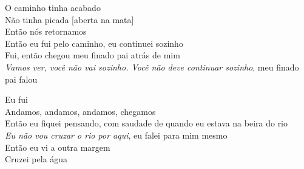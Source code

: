 \bigskip

\begin{linenumbers}\begingroup\raggedright
 
\noindent   O caminho tinha acabado\\
  Não tinha picada {[}aberta na mata{]}\\
  Então nós retornamos\\
  Então eu fui pelo caminho, eu continuei sozinho\\
  Fui, então chegou meu finado pai atrás de mim\\
  \textit{Vamos ver, você não vai sozinho. Você não deve continuar sozinho},
 meu finado pai falou
 
\end{linenumbers}\endgroup

\bigskip

\begin{linenumbers}\begingroup\raggedright
 
\noindent   Eu fui\\
  Andamos, andamos, andamos, chegamos\\
  Então eu fiquei pensando, com saudade de quando eu estava na beira do rio\\
  \textit{Eu não vou cruzar o rio por aqui}, eu falei para mim mesmo\\
  Então eu vi a outra margem\\
  Cruzei pela água
 
\end{linenumbers}\endgroup

\bigskip

